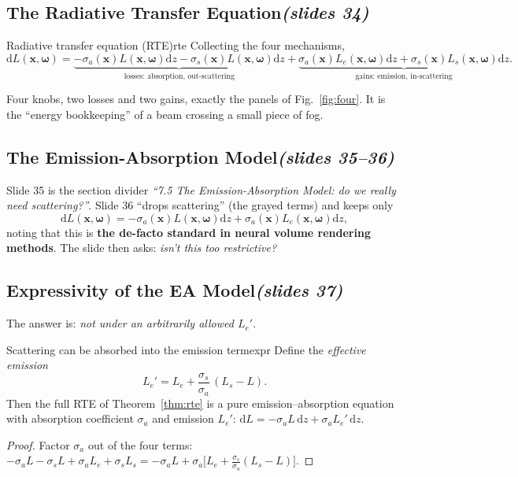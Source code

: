 \documentclass[11pt,a4paper]{article}
\newcommand{\slides}[1]{\texorpdfstring{\hfill{\normalfont\small\emph{(slides #1)}}}{ (slides #1)}}
\newcommand{\x}{\bm{x}}
\newcommand{\w}{\bm{\omega}}
\theoremstyle{remark}\newtheorem*{remark}{Remark}
\begin{document}
\subsection{The Radiative Transfer Equation\slides{34}}

\begin{theorem}{Radiative transfer equation (RTE)}{rte}
Collecting the four mechanisms,
\[
\mathrm dL(\x,\w)=\underbrace{-\sigma_a(\x)L(\x,\w)\mathrm dz-\sigma_s(\x)L(\x,\w)\mathrm dz}_{\text{losses: absorption, out-scattering}}
+\underbrace{\sigma_a(\x)L_e(\x,\w)\mathrm dz+\sigma_s(\x)L_s(\x,\w)\mathrm dz}_{\text{gains: emission, in-scattering}} .
\]
\end{theorem}

\begin{intuition}
Four knobs, two losses and two gains, exactly the panels of Fig.~\ref{fig:four}. It is the ``energy bookkeeping'' of a beam crossing a small piece of fog.
\end{intuition}

\subsection{The Emission-Absorption Model\slides{35--36}}

Slide 35 is the section divider \emph{``7.5 The Emission-Absorption Model: do we really need scattering?''}. Slide 36 ``drops scattering'' (the grayed terms) and keeps only
\[
\mathrm dL(\x,\w)=-\sigma_a(\x)L(\x,\w)\mathrm dz+\sigma_a(\x)L_e(\x,\w)\mathrm dz ,
\]
noting that this is \textbf{the de-facto standard in neural volume rendering methods}. The slide then asks: \emph{isn't this too restrictive?}

\subsection{Expressivity of the EA Model\slides{37}}

The answer is: \emph{not under an arbitrarily allowed $L_e'$}.

\begin{proposition}{Scattering can be absorbed into the emission term}{expr}
Define the \emph{effective emission}
\[
L_e'=L_e+\frac{\sigma_s}{\sigma_a}\,(L_s-L).
\]
Then the full RTE of Theorem~\ref{thm:rte} is a pure emission--absorption equation with absorption coefficient $\sigma_a$ and emission $L_e'$:
$\mathrm dL=-\sigma_aL\,\mathrm dz+\sigma_aL_e'\,\mathrm dz$.
\end{proposition}
\begin{proof}
Factor $\sigma_a$ out of the four terms:
$-\sigma_aL-\sigma_sL+\sigma_aL_e+\sigma_sL_s=-\sigma_aL+\sigma_a\bigl[L_e+\tfrac{\sigma_s}{\sigma_a}(L_s-L)\bigr]$.
\end{proof}
\end{document}
